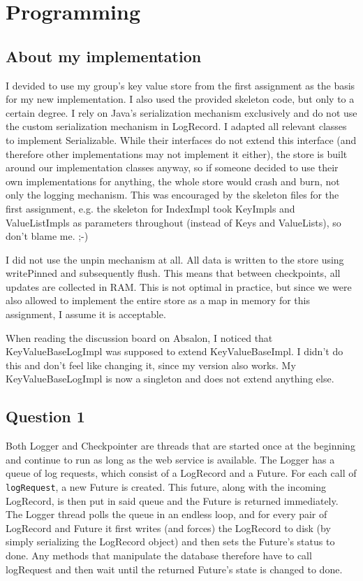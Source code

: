 \documentclass[12pt,a4paper]{article}
\begin{document}
\section*{Programming} 
\label{sec:programming}

\subsection*{About my implementation}
I devided to use my group's key value store from the first assignment as the basis for my new implementation. I also used the provided skeleton code, but only to a certain degree. I rely on Java's serialization mechanism exclusively and do not use the custom serialization mechanism in LogRecord. I adapted all relevant classes to implement Serializable. While their interfaces do not extend this interface (and therefore other implementations may not implement it either), the store is built around our implementation classes anyway, so if someone decided to use their own implementations for anything, the whole store would crash and burn, not only the logging mechanism. This was encouraged by the skeleton files for the first assignment, e.g. the skeleton for IndexImpl took KeyImpls and ValueListImpls as parameters throughout (instead of Keys and ValueLists), so don't blame me. ;-)

I did not use the unpin mechanism at all. All data is written to the store using writePinned and subsequently flush. This means that between checkpoints, all updates are collected in RAM. This is not optimal in practice, but since we were also allowed to implement the entire store as a map in memory for this assignment, I assume it is acceptable. 

When reading the discussion board on Absalon, I noticed that KeyValueBaseLogImpl was supposed to extend KeyValueBaseImpl. I didn't do this and don't feel like changing it, since my version also works. My KeyValueBaseLogImpl is now a singleton and does not extend anything else.

\subsection*{Question 1}
\label{sec:pq1}

Both Logger and Checkpointer are threads that are started once at the beginning and continue to run as long as the web service is available. The Logger has a queue of log requests, which consist of a LogRecord and a Future. For each call of \texttt{logRequest}, a new Future is created. This future, along with the incoming LogRecord, is then put in said queue and the Future is returned immediately. The Logger thread polls the queue in an endless loop, and for every pair of LogRecord and Future it first writes (and forces) the LogRecord to disk (by simply serializing the LogRecord object) and then sets the Future's status to done. Any methods that manipulate the database therefore have to call logRequest and then wait until the returned Future's state is changed to done.
\end{document}

